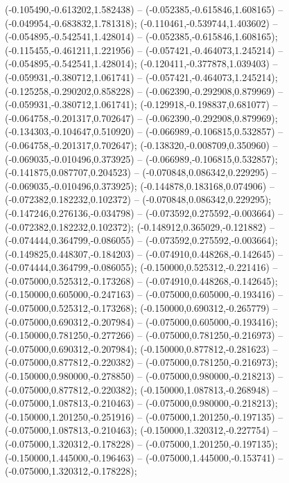  (-0.105490,-0.613202,1.582438) -- (-0.052385,-0.615846,1.608165) -- (-0.049954,-0.683832,1.781318);
 (-0.110461,-0.539744,1.403602) -- (-0.054895,-0.542541,1.428014) -- (-0.052385,-0.615846,1.608165);
 (-0.115455,-0.461211,1.221956) -- (-0.057421,-0.464073,1.245214) -- (-0.054895,-0.542541,1.428014);
 (-0.120411,-0.377878,1.039403) -- (-0.059931,-0.380712,1.061741) -- (-0.057421,-0.464073,1.245214);
 (-0.125258,-0.290202,0.858228) -- (-0.062390,-0.292908,0.879969) -- (-0.059931,-0.380712,1.061741);
 (-0.129918,-0.198837,0.681077) -- (-0.064758,-0.201317,0.702647) -- (-0.062390,-0.292908,0.879969);
 (-0.134303,-0.104647,0.510920) -- (-0.066989,-0.106815,0.532857) -- (-0.064758,-0.201317,0.702647);
 (-0.138320,-0.008709,0.350960) -- (-0.069035,-0.010496,0.373925) -- (-0.066989,-0.106815,0.532857);
 (-0.141875,0.087707,0.204523) -- (-0.070848,0.086342,0.229295) -- (-0.069035,-0.010496,0.373925);
 (-0.144878,0.183168,0.074906) -- (-0.072382,0.182232,0.102372) -- (-0.070848,0.086342,0.229295);
 (-0.147246,0.276136,-0.034798) -- (-0.073592,0.275592,-0.003664) -- (-0.072382,0.182232,0.102372);
 (-0.148912,0.365029,-0.121882) -- (-0.074444,0.364799,-0.086055) -- (-0.073592,0.275592,-0.003664);
 (-0.149825,0.448307,-0.184203) -- (-0.074910,0.448268,-0.142645) -- (-0.074444,0.364799,-0.086055);
 (-0.150000,0.525312,-0.221416) -- (-0.075000,0.525312,-0.173268) -- (-0.074910,0.448268,-0.142645);
 (-0.150000,0.605000,-0.247163) -- (-0.075000,0.605000,-0.193416) -- (-0.075000,0.525312,-0.173268);
 (-0.150000,0.690312,-0.265779) -- (-0.075000,0.690312,-0.207984) -- (-0.075000,0.605000,-0.193416);
 (-0.150000,0.781250,-0.277266) -- (-0.075000,0.781250,-0.216973) -- (-0.075000,0.690312,-0.207984);
 (-0.150000,0.877812,-0.281623) -- (-0.075000,0.877812,-0.220382) -- (-0.075000,0.781250,-0.216973);
 (-0.150000,0.980000,-0.278850) -- (-0.075000,0.980000,-0.218213) -- (-0.075000,0.877812,-0.220382);
 (-0.150000,1.087813,-0.268948) -- (-0.075000,1.087813,-0.210463) -- (-0.075000,0.980000,-0.218213);
 (-0.150000,1.201250,-0.251916) -- (-0.075000,1.201250,-0.197135) -- (-0.075000,1.087813,-0.210463);
 (-0.150000,1.320312,-0.227754) -- (-0.075000,1.320312,-0.178228) -- (-0.075000,1.201250,-0.197135);
 (-0.150000,1.445000,-0.196463) -- (-0.075000,1.445000,-0.153741) -- (-0.075000,1.320312,-0.178228);

